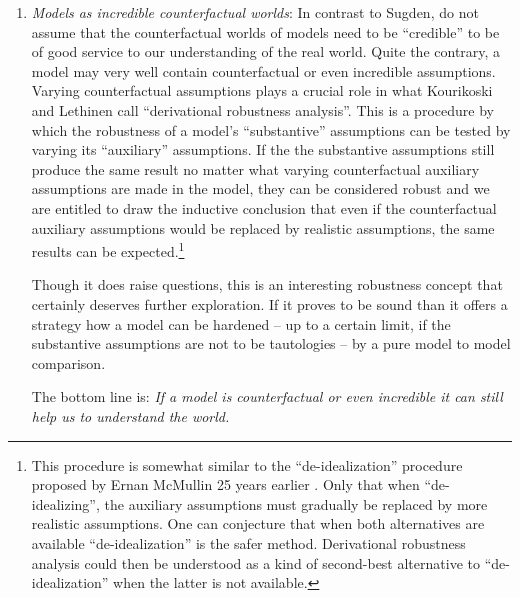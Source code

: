 \documentclass[onecollarge]{STJour}
\numberwithin{equation}{section}
\begin{document}
\begin{enumerate}
  \item {\em Models as incredible counterfactual worlds}: In contrast to
  Sugden, \citet[]{kourikoski-lethinen:2009} do not assume that the
  counterfactual worlds of models need to be ``credible'' to be of good
  service to our understanding of the real world. Quite the contrary, a
  model may very well contain counterfactual or even incredible
  assumptions. Varying counterfactual assumptions plays a crucial role in
  what Kourikoski and Lethinen call ``derivational robustness analysis''.
  This is a procedure by which the robustness of a model's
  ``substantive'' assumptions can be tested by varying its ``auxiliary''
  assumptions. If the the substantive assumptions still produce the same
  result no matter what varying counterfactual auxiliary assumptions are
  made in the model, they can be considered robust and we are entitled to
  draw the inductive conclusion that even if the counterfactual auxiliary
  assumptions would be replaced by realistic assumptions, the same
  results can be expected.\footnote{This procedure is somewhat similar
  to the ``de-idealization'' procedure proposed by Ernan McMullin 25
  years earlier \citep{mcmullin:1985, alexandrova:2008}. Only that when
  ``de-idealizing'', the auxiliary assumptions must gradually be replaced
  by more realistic assumptions. One can conjecture that when both
  alternatives are available ``de-idealization'' is the safer method.
  Derivational robustness analysis could then be understood as a kind of
  second-best alternative to ``de-idealization'' when the latter is not
  available.}

  Though it does raise questions, this is an interesting robustness
  concept that certainly deserves further exploration. If it proves to be
  sound than it offers a strategy how a model can be hardened -- up to a
  certain limit, if the substantive assumptions are not to be 
  tautologies -- by a pure model to model comparison.
  
  The bottom line is: {\em If a model is counterfactual or even
  incredible it can still help us to understand the world.}


\end{enumerate}
\end{document}
